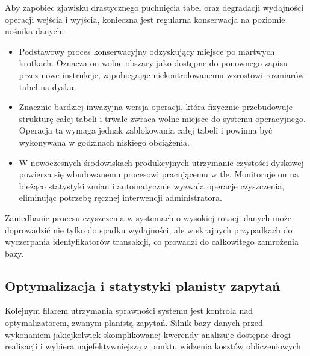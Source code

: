 \documentclass[letterpaper,10pt,english]{sphinxmanual}
\begin{document}
\sphinxAtStartPar
Aby zapobiec zjawisku drastycznego puchnięcia tabel oraz degradacji wydajności operacji wejścia i wyjścia, konieczna jest regularna konserwacja na poziomie nośnika danych:
\begin{itemize}
\item {} 
\sphinxAtStartPar
{} Podstawowy proces konserwacyjny odzyskujący miejsce po martwych krotkach. Oznacza on wolne obszary jako dostępne do ponownego zapisu przez nowe instrukcje, zapobiegając niekontrolowanemu wzrostowi rozmiarów tabel na dysku.

\item {} 
\sphinxAtStartPar
{} Znacznie bardziej inwazyjna wersja operacji, która fizycznie przebudowuje strukturę całej tabeli i trwale zwraca wolne miejsce do systemu operacyjnego. Operacja ta wymaga jednak zablokowania całej tabeli i powinna być wykonywana w godzinach niskiego obciążenia.

\item {} 
\sphinxAtStartPar
{} W nowoczesnych środowiskach produkcyjnych utrzymanie czystości dyskowej powierza się wbudowanemu procesowi pracującemu w tle. Monitoruje on na bieżąco statystyki zmian i automatycznie wyzwala operacje czyszczenia, eliminując potrzebę ręcznej interwencji administratora.

\end{itemize}

\sphinxAtStartPar
Zaniedbanie procesu czyszczenia w systemach o wysokiej rotacji danych może doprowadzić nie tylko do spadku wydajności, ale w skrajnych przypadkach do wyczerpania identyfikatorów transakcji, co prowadzi do całkowitego zamrożenia bazy.

\begin{sphinxVerbatim}[commandchars=\\\{\}]
\end{sphinxVerbatim}


\subsection{Optymalizacja i statystyki planisty zapytań}
\label{\detokenize{rozdzial_2/rozdzial_23/index:optymalizacja-i-statystyki-planisty-zapytan}}
\sphinxAtStartPar
Kolejnym filarem utrzymania sprawności systemu jest kontrola nad optymalizatorem, zwanym planistą zapytań. Silnik bazy danych przed wykonaniem jakiejkolwiek skomplikowanej kwerendy analizuje dostępne drogi realizacji i wybiera najefektywniejszą z punktu widzenia kosztów obliczeniowych.
\end{document}
